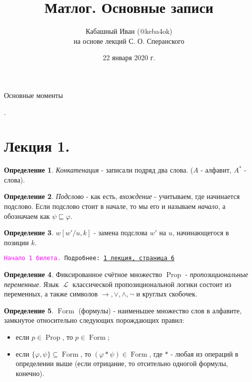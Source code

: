 \documentclass[a4paper,100pt]{article}
\title{Матлог. Основные записи}
\author{Кабашный Иван (@keba4ok) \\ на основе лекций С. О. Сперанского}
\date{22 января 2020 г.}
\theoremstyle{indented}
\theoremstyle{definition}
\newtheorem{defn}{Определение}
\theoremstyle{remark}
\DeclareMathOperator{\Prop}{Prop}
\DeclareMathOperator{\LL}{\mathscr{L}}
\DeclareMathOperator{\form}{Form}
\begin{document}
\newcommand{\resetexlcounters}{%
  \setcounter{exl}{0}%
} 

\newcommand{\resetremarkcounters}{%
  \setcounter{remark}{0}%
} 

\newcommand{\reseconscounters}{%
  \setcounter{cons}{0}%
} 

\newcommand{\resetall}{%
    \resetexlcounters
    \resetremarkcounters
    \reseconscounters%
}

\maketitle 

\newpage

\hypertarget{t1}{Основные моменты}. 
\tableofcontents

\newpage

\section{Лекция 1.}

\begin{defn}
  \textit{Конкатенация} - записали подряд два слова. ($A$ - алфавит, $A^*$ - слова).
\end{defn}

\begin{defn}
  \textit{Подслово} - как есть, \textit{вхождение} - учитываем, где начинается подслово. Если подслово стоит в начале, то мы его и называем \textit{начало}, а обозначаем как $\psi \sqsubseteq \varphi$.
\end{defn}

\begin{defn}
  $w[w'/u, k]$ - замена подслова $w'$ на $u$, начинающегося в позиции $k$.
\end{defn}

\hrulefill

\texttt{\hypertarget{b1}{\textcolor{magenta}{Начало 1 билета.}} Подробнее: \href{http://www.mi-ras.ru/~speranski/courses/logic-1-2021-spring/slides_1.pdf}{1 лекция, страница 6}} 

\begin{defn}
  Фиксированное счётное множество $\Prop$ - \textit{пропозициональные переменные}. Язык $\LL$ классической пропозициональной логики состоит из переменных, а также символов $\rightarrow, \vee, \wedge, \neg$ и круглых скобочек.
\end{defn}

\begin{defn}
  $\form$ (формулы) - наименьшее множество слов в алфавите, замкнутое относительно следующих порождающих правил:
  \begin{itemize}
    \item если $p\in \Prop$, то $p\in \form$; 
    \item если $\{\varphi, \psi\}\subseteq \form$, то $(\varphi*\psi)\in \form$, где $*$ - любая из операций в определении выше (если отрицание, то отсительно одногой формулы, конечно).
  \end{itemize}
\end{defn}
\end{document}
